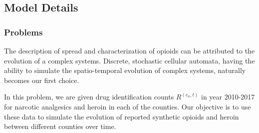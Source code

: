 \documentclass[a4paper]{article}
\begin{document}
\renewcommand{\baselinestretch}{1.3}
\vspace{8pt}
\begin{table}[h]
\begin{center}
\caption{Mathematical Notations}
\label{tab1e33}
\end{center}
\end{table}
\renewcommand{\baselinestretch}{1.0}

\subsection{Model Details}

\subsubsection*{Problems}

The description of spread and characterization of opioids can be attributed to the evolution of a complex systems. Discrete, stochastic cellular automata, having the ability to simulate the spatio-temporal evolution of complex systems, naturally becomes our first choice. 

In this problem, we are given drug identification counts $R^{(c_n,t)}$ in year 2010-2017 for narcotic analgesics and heroin in each of the counties. Our objective is to use these data to simulate the evolution of reported synthetic opioids and heroin between different counties over time. 
\end{document}
